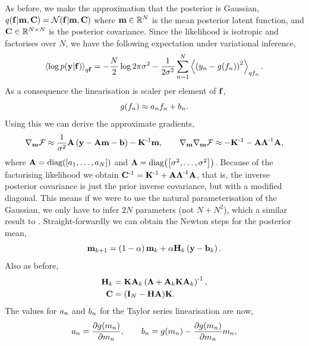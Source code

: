 \documentclass{article} %
\begin{document}
As before, we make the approximation that the posterior is Gaussian,
$\qrobC{\lstate}{\pomean, \pocov} = \gausC{\lstate}{\pomean, \pocov}$ where
$\pomean \in \real{N}$ is the mean posterior latent function, and $\pocov \in
\real{N \times N}$ is the posterior covariance. Since the likelihood is
isotropic and factorises over $N$, we have the following expectation under
variational inference,
\begin{equation*}
    \expec{q\lstate}{\log\probC{\obs}{\lstate}} =
        - \frac{N}{2}\log{2\pi\lvar}
        - \frac{1}{2\lvar} \sum_{n=1}^N 
            \expec{q\lstates_n}{\brac{\obss_n - \nonlin{\lstates_n}}^2}.
\end{equation*}
As a consequence the linearisation is scaler per element of $\lstate$,
\begin{equation}
    \nonlin{\lstates_n} \approx \Lins_n\lstates_n + \intcpts_n.
\end{equation}
Using this we can derive the approximate gradients,
\begin{equation}
    \nabla_\pomean\Fengy \approx \frac{1}{\lvar}\Linmat\brac{\obs -
        \Linmat\pomean - \intcpt} - \KERNL\inv\pomean,
    \qquad
    \nabla_\pomean\nabla_\pomean \Fengy \approx -\KERNL\inv
    -\Linmat\Lvar\inv\Linmat,
\end{equation}
where $\Linmat = \diag{\sbrac{\Lins_1, \ldots, \Lins_N}}$ and $\Lvar =
\diag{\sbrac{\lvar, \ldots, \lvar}}$. Because of the factorising likelihood we
obtain $\pocov\inv = \KERNL\inv + \Linmat\Lvar\inv\Linmat$, that is, the
inverse posterior covariance is just the prior inverse covariance, but with a
modified diagonal. This means if we were to use the natural parameterisation of
the Gaussian, we only have to infer $2N$ parameters (not $N + N^2$), which a
similar result to \cite{Opper2009}.  Straight-forwardly we can obtain the
Newton steps for the posterior mean,
\begin{equation}
    \pomean_{k+1} = \brac{1-\step}\pomean_k 
        + \step\Kgain_k\brac{\obs - \intcpt_k}.
\end{equation}
Also as before,
\begin{align}
    \Kgain_k &= \KERNL\Linmat_k\brac{\Lvar + \Linmat_k\KERNL\Linmat_k}\inv, \\
    \pocov &= \brac{\ident{N} - \Kgain\Linmat}\!\KERNL.
\end{align}
The values for $\Lins_n$ and $\intcpts_n$ for the Taylor series linearisation
are now,
\begin{equation}
    \Lins_n = \frac{\partial\nonlin{\pomeans_n}}{\partial\pomeans_n},
    \qquad
    \intcpts_n = \nonlin{\pomeans_n}
        - \frac{\partial\nonlin{\pomeans_n}}{\partial\pomeans_n} \pomeans_n,
\end{equation}
\end{document}
